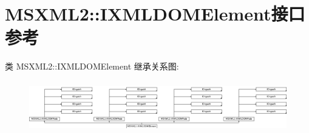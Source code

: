 \hypertarget{interface_m_s_x_m_l2_1_1_i_x_m_l_d_o_m_element}{}\section{M\+S\+X\+M\+L2\+:\+:I\+X\+M\+L\+D\+O\+M\+Element接口 参考}
\label{interface_m_s_x_m_l2_1_1_i_x_m_l_d_o_m_element}
类 M\+S\+X\+M\+L2\+:\+:I\+X\+M\+L\+D\+O\+M\+Element 继承关系图\+:\begin{figure}[H]
\begin{center}
\leavevmode
\includegraphics[height=2.295082cm]{interface_m_s_x_m_l2_1_1_i_x_m_l_d_o_m_element}
\end{center}
\end{figure}
